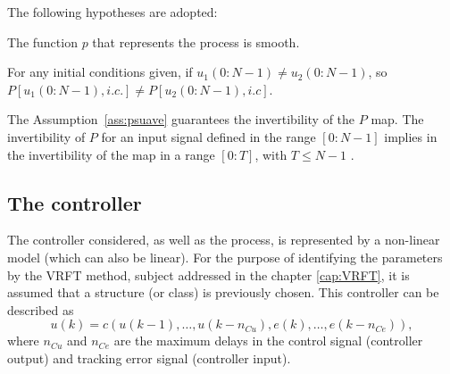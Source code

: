 The following hypotheses are adopted:
\begin{assum}\label{ass:psuave}
   The function $p$ that represents the process is smooth.
\end{assum}
\begin{assum}\label{ass:invert}
   For any initial conditions given, if
   $u_{1}(0{:}N-1) \neq u_{2}(0{:} N-1)$, so $P\left[u_{1}(0{:} N-1), i . c .\right] \neq P\left[u_{2}(0{:} N-1), i . c\right]$.
\end{assum}

The Assumption~\ref{ass:psuave} guarantees the invertibility of the $P$ map. The invertibility of $P$ for an input signal defined in the range $\left[ 0{:}N-1 \right]$
implies in the invertibility of the map in a range $[0{:}T]$, with $T\le N-1$ \citep{campi2004}.


\subsection{The controller}%
\label{sub:o_controlador}

The controller considered, as well as the process, is represented by a non-linear model (which can also be linear). For the purpose of identifying the parameters by the VRFT method, subject addressed in the chapter \ref{cap:VRFT}, it is assumed that a structure (or class) is previously chosen. This controller can be described as
\begin{equation}
   u(k)=c\left(u(k-1), \ldots, u(k-n_{C u}), e(k), \ldots, e(k-n_{C e})\right),
\label{eq:uknl}
\end{equation}
where $n_{Cu}$ and $n_{Ce}$ are the maximum delays in the control signal (controller output) and tracking error signal (controller input).

